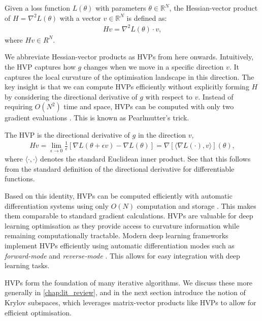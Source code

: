 \begin{definition}
    Given a loss function $L(\theta)$ with parameters $\theta \in \mathbb{R}^N$, the Hessian-vector product of $H = \nabla^2 L(\theta)$ with a vector $v \in \mathbb{R}^N$ is defined as:
    \begin{align}
        Hv = \nabla^2 L(\theta) \cdot v, 
    \end{align}
    where $Hv \in R^N$.
\end{definition}
We abbreviate Hessian-vector products as HVPs from here onwards. Intuitively, the HVP captures how $g$ changes when we move in a specific direction $v$. It captures the local curvature of the optimisation landscape in this direction. The key insight is that we can compute HVPs efficiently without explicitly forming $H$ by considering the directional derivative of $g$ with respect to $v$. Instead of requiring $O(N^2)$ time and space, HVPs can be computed with only two gradient evaluations \citep{pearlmutter1994fast, bloghvp, martens2010hessianfree}. This is known as Pearlmutter's trick.

\begin{definition} The HVP is the directional derivative of $g$ in the direction $v$,
\begin{align}
    Hv = \lim_{\epsilon \to 0} \frac{1}{\epsilon}[\nabla L(\theta + \epsilon v) - \nabla L(\theta)] = \nabla[\langle\nabla L(\cdot), v\rangle](\theta), 
\end{align} 
where $\langle \cdot, \cdot \rangle$ denotes the standard Euclidean inner product. See that this follows from the standard definition of the directional derivative for differentiable functions.
\end{definition}
Based on this identity, HVPs can be computed efficiently with automatic differentiation systems using only $O(N)$ computation and storage \citep{pytorch}. This makes them comparable to standard gradient calculations. HVPs are valuable for deep learning optimisation as they provide access to curvature information while remaining computationally tractable. Modern deep learning frameworks implement HVPs efficiently using automatic differentiation modes such as \textit{forward-mode} and \textit{reverse-mode} \citep{pytorch,henriques2019small}. This allows for easy integration with deep learning tasks.

HVPs form the foundation of many iterative algorithms. We discuss these more generally in \cref{chap:lit_review}, and in the next section introduce the notion of Krylov subspaces, which leverages matrix-vector products like HVPs to allow for efficient optimisation.

